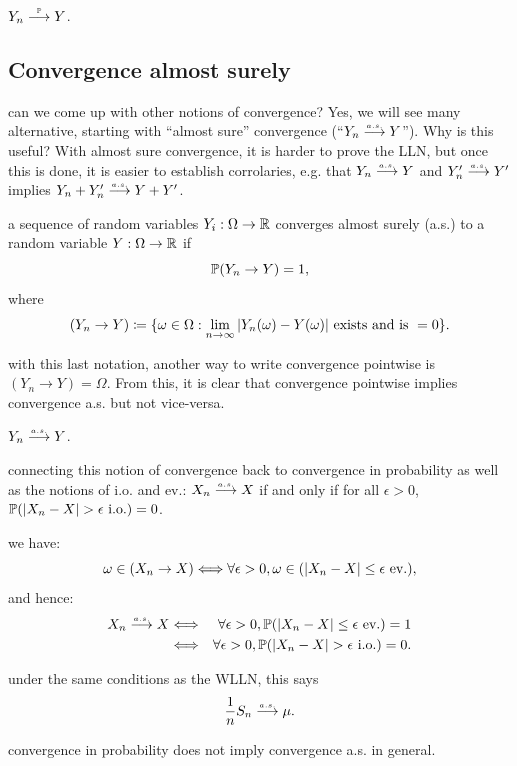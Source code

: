 \documentclass{article}
\begin{document}
 $Y_n \pcv Y$.


\subsection{Convergence almost surely}

 can we come up with other notions of convergence? Yes, we will see many alternative, starting with ``almost sure'' convergence (``$Y_n \ascv Y$''). Why is this useful? With almost sure convergence, it is harder to prove the LLN, but once this is done, it is easier to establish corrolaries, e.g. that $Y_n \ascv Y$ and $Y'_n \ascv Y'$ implies $Y_n + Y'_n \ascv Y + Y'$.

 a sequence of random variables $Y_i : \Omega \to \R$ converges almost surely (a.s.) to a random variable $Y: \Omega \to \R$ if \[ \P(Y_n \to Y) = 1,\] where \[ (Y_n \to Y) \defeq \{ \omega \in\Omega : \lim_{n\to\infty} |Y_n(\omega) - Y(\omega)|\text{ exists and is }=0\}. \]

 with this last notation, another way to write convergence pointwise is $(Y_n \to Y) = \Omega$. From this, it is clear that convergence pointwise implies convergence a.s. but not vice-versa.

 $Y_n \ascv Y$.

 connecting this notion of convergence back to convergence in probability as well as the notions of i.o. and ev.: $X_n \ascv X$ if and only if for all $\epsilon > 0$, $\P(|X_n - X| > \epsilon\io) = 0$.

 we have: \[\omega \in (X_n \to X) \Longleftrightarrow \forall \epsilon>0, \omega\in (|X_n-X| \le \epsilon \ev),\] and hence:
\begin{eqnarray*}
X_n \ascv X &\Longleftrightarrow& \forall \epsilon >0, \P(|X_n - X| \le \epsilon \ev) = 1 \\
&\Longleftrightarrow& \forall \epsilon > 0, \P(|X_n - X| > \epsilon \io) = 0.
\end{eqnarray*}

 under the same conditions as the WLLN, this says \[ \frac{1}{n} S_n \ascv \mu. \]

 convergence in probability does not imply convergence a.s. in general.
\end{document}

